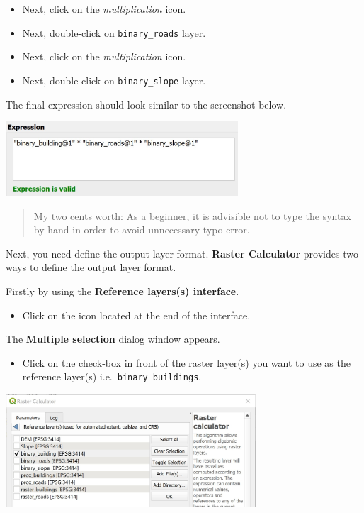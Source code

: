 \documentclass[
  letterpaper,
  DIV=11,
  numbers=noendperiod]{scrreprt}
\providecommand{\tightlist}{%
  \setlength{\itemsep}{0pt}\setlength{\parskip}{0pt}}\usepackage{longtable,booktabs,array}
\begin{document}
\begin{itemize}
\tightlist
\item
  Next, click on the \emph{multiplication} icon.
\item
  Next, double-click on \texttt{binary\_roads} layer.
\item
  Next, click on the \emph{multiplication} icon.
\item
  Next, double-click on \texttt{binary\_slope} layer.
\end{itemize}

The final expression should look similar to the screenshot below.

\includegraphics[width=0.65\textwidth,height=\textheight]{./img07/image42.jpg}

\begin{quote}
My two cents worth: As a beginner, it is advisible not to type the
syntax by hand in order to avoid unnecessary typo error.
\end{quote}

Next, you need define the output layer format. \textbf{Raster
Calculator} provides two ways to define the output layer format.

Firstly by using the \textbf{Reference layers(s) interface}.

\begin{itemize}
\tightlist
\item
  Click on the icon located at the end of the interface.
\end{itemize}

The \textbf{Multiple selection} dialog window appears.

\begin{itemize}
\tightlist
\item
  Click on the check-box in front of the raster layer(s) you want to use
  as the reference layer(s) i.e.~\texttt{binary\_buildings}.
\end{itemize}

\includegraphics[width=0.7\textwidth,height=\textheight]{./img07/image43.jpg}
\end{document}
